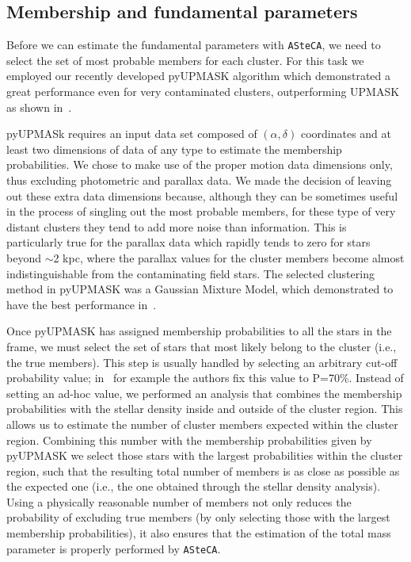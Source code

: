 \documentclass[referee]{aa}
\begin{document}
 \subsection{Membership and fundamental parameters}
  \label{ssec:fund_pars}

  Before we can estimate the fundamental parameters with \texttt{ASteCA}, we
  need to select the set of most probable members for each cluster. For this
  task we employed our recently developed pyUPMASK algorithm which demonstrated
  a great performance even for very contaminated clusters, outperforming
  UPMASK~\citep{Krone2014} as shown in~\cite{Pera_2021}.

  pyUPMASk requires an input data set composed of $(\alpha, \delta)$ coordinates
  and at least two dimensions of data of any type to estimate the membership
  probabilities. We chose to make use of the proper motion data dimensions only,
  thus excluding photometric and parallax data.
  We made the decision of leaving out these extra data dimensions because,
  although they can be sometimes useful in the process of singling out the most
  probable members, for these type of very distant clusters they tend to add
  more noise than information.
  This is particularly true for the parallax data which
  rapidly tends to zero for stars beyond $\sim$2 kpc, where the parallax values
  for the cluster members become almost indistinguishable from the contaminating
  field stars. The selected clustering method in pyUPMASK was a Gaussian Mixture
  Model, which demonstrated to have the best performance
  in~\citet[][see Sect. 4]{Pera_2021}.

  Once pyUPMASK has assigned membership probabilities to all the stars in the
  frame, we must select the set of stars that most likely belong to the
  cluster (i.e., the true members). This step is usually handled by selecting
  an arbitrary cut-off probability value; in~\cite{Cantat_2020} for example
  the authors fix this value to P=70\%. Instead of setting an ad-hoc value, we
  performed an analysis that combines the membership probabilities with the
  stellar density inside and outside of the cluster region. This allows us to
  estimate the number of cluster members expected within the cluster region.
  Combining this number with the membership probabilities given by pyUPMASK we
  select those stars with the largest probabilities within the cluster region,
  such that the resulting total number of members is as close as possible as the
  expected one (i.e., the one obtained through the stellar density analysis).
  Using a physically reasonable number of members not only reduces the
  probability of excluding true members (by only selecting those with the
  largest membership probabilities), it also ensures that the estimation of the
  total mass parameter is properly performed by \texttt{ASteCA}.\\
\end{document}
